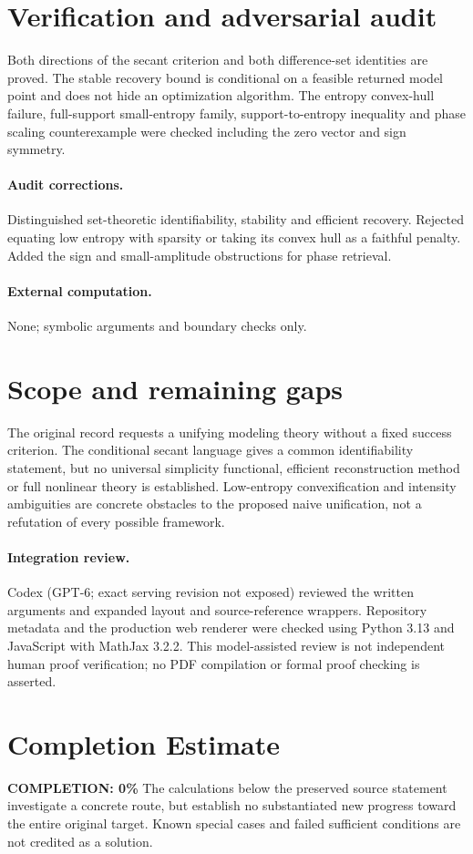 \documentclass[11pt]{article}
\begin{document}
\section{Verification and adversarial audit}
Both directions of the secant criterion and both difference-set identities are proved. The stable recovery bound is conditional on a feasible returned model point and does not hide an optimization algorithm. The entropy convex-hull failure, full-support small-entropy family, support-to-entropy inequality and phase scaling counterexample were checked including the zero vector and sign symmetry.
\paragraph{Audit corrections.} Distinguished set-theoretic identifiability, stability and efficient recovery. Rejected equating low entropy with sparsity or taking its convex hull as a faithful penalty. Added the sign and small-amplitude obstructions for phase retrieval.
\paragraph{External computation.} None; symbolic arguments and boundary checks only.
\section{Scope and remaining gaps}
The original record requests a unifying modeling theory without a fixed success criterion. The conditional secant language gives a common identifiability statement, but no universal simplicity functional, efficient reconstruction method or full nonlinear theory is established. Low-entropy convexification and intensity ambiguities are concrete obstacles to the proposed naive unification, not a refutation of every possible framework.
\paragraph{Integration review.} Codex (GPT-6; exact serving revision not exposed) reviewed the written arguments and expanded layout and source-reference wrappers. Repository metadata and the production web renderer were checked using Python 3.13 and JavaScript with MathJax 3.2.2. This model-assisted review is not independent human proof verification; no PDF compilation or formal proof checking is asserted.

\section{Completion Estimate}
\noindent\textbf{COMPLETION: 0\%}
The calculations below the preserved source statement investigate a concrete route,
but establish no substantiated new progress toward the entire original target.
Known special cases and failed sufficient conditions are not credited as a solution.
\end{document}
